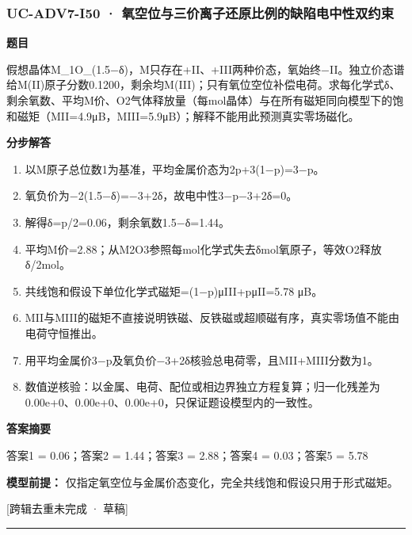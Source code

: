 \documentclass[UTF8,11pt,a4paper]{ctexart}
\begin{document}
\subsubsection*{UC-ADV7-I50 · 氧空位与三价离子还原比例的缺陷电中性双约束}
\noindent\textbf{题目}\par
假想晶体M\_1O\_(1.5−δ)，M只存在+II、+III两种价态，氧始终−II。独立价态谱给M(II)原子分数0.1200，剩余均M(III)；只有氧位空位补偿电荷。求每化学式δ、剩余氧数、平均M价、O2气体释放量（每mol晶体）与在所有磁矩同向模型下的饱和磁矩（MII=4.9μB，MIII=5.9μB）；解释不能用此预测真实零场磁化。\par
\medskip\noindent\textbf{分步解答}
\begin{enumerate}
\item 以M原子总位数1为基准，平均金属价态为2p+3(1−p)=3−p。
\item 氧负价为−2(1.5−δ)=−3+2δ，故电中性3−p−3+2δ=0。
\item 解得δ=p/2=0.06，剩余氧数1.5−δ=1.44。
\item 平均M价=2.88；从M2O3参照每mol化学式失去δmol氧原子，等效O2释放δ/2mol。
\item 共线饱和假设下单位化学式磁矩=(1−p)μIII+pμII=5.78 μB。
\item MII与MIII的磁矩不直接说明铁磁、反铁磁或超顺磁有序，真实零场值不能由电荷守恒推出。
\item 用平均金属价3−p及氧负价−3+2δ核验总电荷零，且MII+MIII分数为1。
\item 数值逆核验：以金属、电荷、配位或相边界独立方程复算；归一化残差为0.00e+0、0.00e+0、0.00e+0，只保证题设模型内的一致性。
\end{enumerate}
\noindent\textbf{答案摘要}\par
答案1 = 0.06；答案2 = 1.44；答案3 = 2.88；答案4 = 0.03；答案5 = 5.78\par
\noindent\textbf{模型前提：}
仅指定氧空位与金属价态变化，完全共线饱和假设只用于形式磁矩。\par
\noindent\textcolor{red!65!black}{[跨辑去重未完成 · 草稿]} \par
\medskip\hrule\medskip
{}
\end{document}
